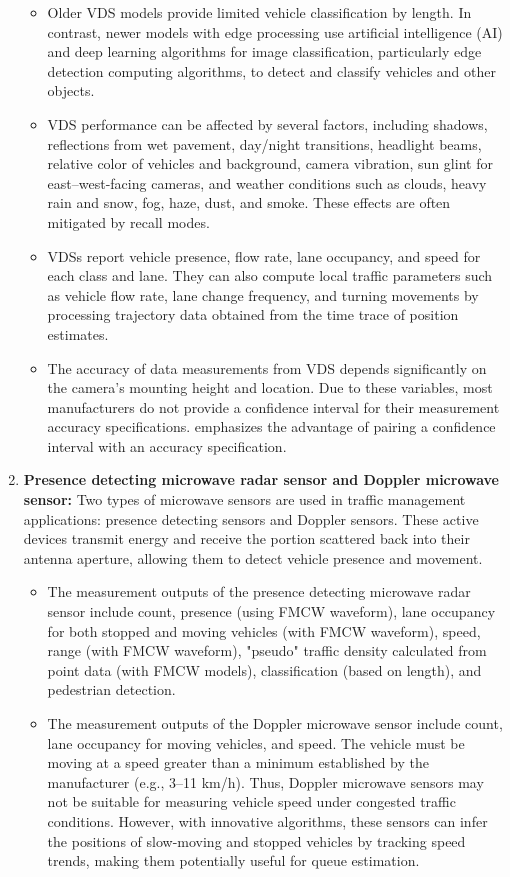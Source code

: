 \begin{enumerate}
    \begin{itemize}
        \item Older VDS models provide limited vehicle classification by length. In contrast, newer models with edge processing use artificial intelligence (AI) and deep learning algorithms for image classification, particularly edge detection computing algorithms, to detect and classify vehicles and other objects.
        \item VDS performance can be affected by several factors, including shadows, reflections from wet pavement, day/night transitions, headlight beams, relative color of vehicles and background, camera vibration, sun glint for east–west-facing cameras, and weather conditions such as clouds, heavy rain and snow, fog, haze, dust, and smoke. These effects are often mitigated by recall modes.
        \item VDSs report vehicle presence, flow rate, lane occupancy, and speed for each class and lane. They can also compute local traffic parameters such as vehicle flow rate, lane change frequency, and turning movements by processing trajectory data obtained from the time trace of position estimates.
        \item The accuracy of data measurements from VDS depends significantly on the camera's mounting height and location. Due to these variables, most manufacturers do not provide a confidence interval for their measurement accuracy specifications. \textcite{klein2017its} emphasizes the advantage of pairing a confidence interval with an accuracy specification.
    \end{itemize}
    \item \textbf{Presence detecting microwave radar sensor and Doppler microwave sensor:} Two types of microwave sensors are used in traffic management applications: presence detecting sensors and Doppler sensors. These active devices transmit energy and receive the portion scattered back into their antenna aperture, allowing them to detect vehicle presence and movement.
    \begin{itemize}
        \item The measurement outputs of the presence detecting microwave radar sensor include count, presence (using FMCW waveform), lane occupancy for both stopped and moving vehicles (with FMCW waveform), speed, range (with FMCW waveform), "pseudo" traffic density calculated from point data (with FMCW models), classification (based on length), and pedestrian detection.
        \item The measurement outputs of the Doppler microwave sensor include count, lane occupancy for moving vehicles, and speed. The vehicle must be moving at a speed greater than a minimum established by the manufacturer (e.g., 3–11 km/h). Thus, Doppler microwave sensors may not be suitable for measuring vehicle speed under congested traffic conditions. However, with innovative algorithms, these sensors can infer the positions of slow-moving and stopped vehicles by tracking speed trends, making them potentially useful for queue estimation.

\end{itemize}
\end{enumerate}
